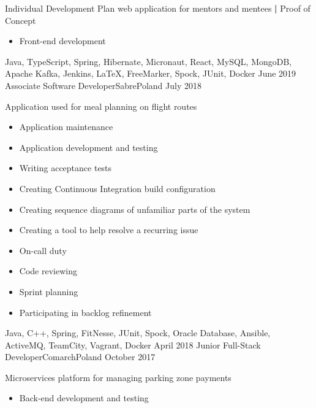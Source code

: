 \begin{experiences}
{\begin{itemize}
                        \end{itemize}
                        Individual Development Plan web application for mentors and mentees \textbf{|} \small{Proof of Concept}\normalsize
                        \begin{itemize}
                            \item Front-end development
                        \end{itemize}
                    }
                    {Java, TypeScript, Spring, Hibernate, Micronaut, React, MySQL, MongoDB, Apache Kafka, Jenkins, LaTeX, FreeMarker, Spock, JUnit, Docker}
  \emptySeparator
  \experience
    {June 2019} {Associate Software Developer}{Sabre}{Poland}
    {July 2018}    {
                        Application used for meal planning on flight routes
                        \begin{itemize}
                            \item Application maintenance
                            \item Application development and testing
                            \item Writing acceptance tests
                            \item Creating Continuous Integration build configuration
                            \item Creating sequence diagrams of unfamiliar parts of the system  
                            \item Creating a tool to help resolve a  recurring issue
                            \item On-call duty
                            \item Code reviewing
                            \item Sprint planning
                            \item Participating in backlog refinement
                        \end{itemize}
                    }
                    {Java, C++, Spring, FitNesse, JUnit, Spock, Oracle Database, Ansible, ActiveMQ, TeamCity, Vagrant, Docker}
  \emptySeparator
  \experience
    {April 2018}     {Junior Full-Stack Developer}{Comarch}{Poland}
    {October 2017}    {
                        Microservices platform for managing parking zone payments
                        \begin{itemize}
                            \item Back-end development and testing

\end{itemize}}
\end{experiences}
